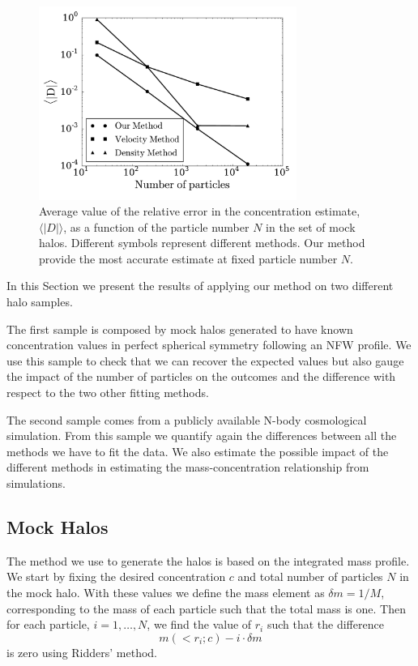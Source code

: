 \documentclass{emulateapj}
\newcommand{\avg}[1]{\langle{#1}\rangle}
\begin{document}
\begin{figure}
\begin{center}
  \includegraphics[width=0.75\textwidth]{error.pdf}
\end{center}
\caption{Average value of the relative error in the concentration
  estimate, $\avg{|D|}$, as a function of the particle number $N$ in
  the set of mock halos. Different symbols represent different
  methods. Our method provide the most accurate estimate at fixed
  particle number $N$.
    \label{fig:error}}
\end{figure}


In this Section we present the results of applying our method on two
different halo samples.

The first sample is composed by mock halos generated to have known
concentration values in perfect spherical symmetry following an NFW
profile.
We use this sample to check that we can recover the expected values
but also gauge the impact of the number of particles on the outcomes
and the difference with respect to the two other fitting methods.

The second sample comes from a publicly available N-body cosmological
simulation.
From this sample we quantify again the differences between all the
methods we have to fit the data.
We also estimate the possible impact of the different methods in
estimating the mass-concentration relationship from simulations.




\subsection{Mock Halos}

The method we use to generate the halos is based on the integrated
mass profile.
We start by fixing the desired concentration $c$ and total number of
particles $N$ in the mock halo.
With these values we define the mass element as $\delta m = 1/M$, corresponding
to the mass of each particle such that the total mass is one.
Then for each particle, $i=1,\ldots,N$, we find the value of $r_i$ such that
the difference
%
\begin{equation}
m(<r_i;c) - i \cdot \delta m
\end{equation}
%
is zero using Ridders' method.
\end{document}
